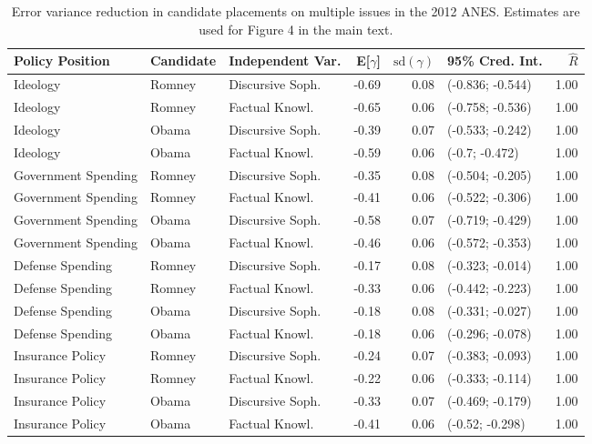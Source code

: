 \begin{table}[ht]
\centering
\caption{Error variance reduction in candidate placements on multiple issues in the 2012 ANES. 
         Estimates are used for Figure 4 in the main text.} 
\label{app:hetreg2012}
\begin{tabular}{lllrrlr}
  \hline
Policy Position & Candidate & Independent Var. & E[$\gamma$] & $\text{sd}(\gamma)$ & 95\% Cred. Int. & $\hat{R}$ \\ 
  \hline
Ideology & Romney & Discursive Soph. & -0.69 & 0.08 & (-0.836; -0.544) & 1.00 \\ 
  Ideology & Romney & Factual Knowl. & -0.65 & 0.06 & (-0.758; -0.536) & 1.00 \\ 
  Ideology & Obama & Discursive Soph. & -0.39 & 0.07 & (-0.533; -0.242) & 1.00 \\ 
  Ideology & Obama & Factual Knowl. & -0.59 & 0.06 & (-0.7; -0.472) & 1.00 \\ 
  Government Spending & Romney & Discursive Soph. & -0.35 & 0.08 & (-0.504; -0.205) & 1.00 \\ 
  Government Spending & Romney & Factual Knowl. & -0.41 & 0.06 & (-0.522; -0.306) & 1.00 \\ 
  Government Spending & Obama & Discursive Soph. & -0.58 & 0.07 & (-0.719; -0.429) & 1.00 \\ 
  Government Spending & Obama & Factual Knowl. & -0.46 & 0.06 & (-0.572; -0.353) & 1.00 \\ 
  Defense Spending & Romney & Discursive Soph. & -0.17 & 0.08 & (-0.323; -0.014) & 1.00 \\ 
  Defense Spending & Romney & Factual Knowl. & -0.33 & 0.06 & (-0.442; -0.223) & 1.00 \\ 
  Defense Spending & Obama & Discursive Soph. & -0.18 & 0.08 & (-0.331; -0.027) & 1.00 \\ 
  Defense Spending & Obama & Factual Knowl. & -0.18 & 0.06 & (-0.296; -0.078) & 1.00 \\ 
  Insurance Policy & Romney & Discursive Soph. & -0.24 & 0.07 & (-0.383; -0.093) & 1.00 \\ 
  Insurance Policy & Romney & Factual Knowl. & -0.22 & 0.06 & (-0.333; -0.114) & 1.00 \\ 
  Insurance Policy & Obama & Discursive Soph. & -0.33 & 0.07 & (-0.469; -0.179) & 1.00 \\ 
  Insurance Policy & Obama & Factual Knowl. & -0.41 & 0.06 & (-0.52; -0.298) & 1.00 \\ 

\end{tabular}
\end{table}
